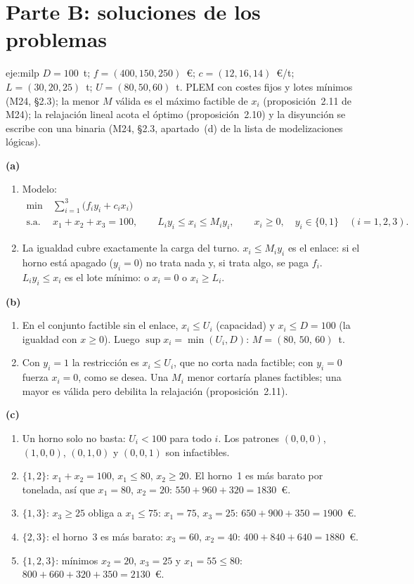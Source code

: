 \section{Parte B: soluciones de los problemas}

\begin{solucion}{eje:milp}
\datos $D=100$~t; $f=(400,150,250)$~€; $c=(12,16,14)$~€/t; $L=(30,20,25)$~t; $U=(80,50,60)$~t.
\planteamiento PLEM con costes fijos y lotes mínimos (M24, §2.3); la menor $M$ válida es el máximo factible de $x_i$ (proposición~2.11 de M24); la relajación lineal acota el óptimo (proposición~2.10) y la disyunción se escribe con una binaria (M24, §2.3, apartado~(d) de la lista de modelizaciones lógicas).
\pasos

\noindent\textbf{(a)}
\begin{enumerate}[label=\arabic*.]
  \item Modelo:
  \[
  \begin{aligned}
  \min\ &\sum_{i=1}^{3}\bigl(f_iy_i+c_ix_i\bigr)\\
  \text{s.a.}\ &x_1+x_2+x_3=100,\qquad L_iy_i\le x_i\le M_iy_i,\qquad x_i\ge 0,\quad y_i\in\{0,1\}\quad(i=1,2,3).
  \end{aligned}
  \]
  \item La igualdad cubre exactamente la carga del turno. $x_i\le M_iy_i$ es el enlace: si el horno está apagado ($y_i=0$) no trata nada y, si trata algo, se paga $f_i$. $L_iy_i\le x_i$ es el lote mínimo: o $x_i=0$ o $x_i\ge L_i$.
\end{enumerate}

\noindent\textbf{(b)}
\begin{enumerate}[label=\arabic*.]
  \item En el conjunto factible sin el enlace, $x_i\le U_i$ (capacidad) y $x_i\le D=100$ (la igualdad con $x\ge 0$). Luego $\sup x_i=\min(U_i,D)$: $M=(80,\,50,\,60)$~t.
  \item Con $y_i=1$ la restricción es $x_i\le U_i$, que no corta nada factible; con $y_i=0$ fuerza $x_i=0$, como se desea. Una $M_i$ menor cortaría planes factibles; una mayor es válida pero debilita la relajación (proposición~2.11).
\end{enumerate}

\noindent\textbf{(c)}
\begin{enumerate}[label=\arabic*.]
  \item Un horno solo no basta: $U_i<100$ para todo $i$. Los patrones $(0,0,0)$, $(1,0,0)$, $(0,1,0)$ y $(0,0,1)$ son infactibles.
  \item $\{1,2\}$: $x_1+x_2=100$, $x_1\le 80$, $x_2\ge 20$. El horno~1 es más barato por tonelada, así que $x_1=80$, $x_2=20$: $550+960+320=1830$~€.
  \item $\{1,3\}$: $x_3\ge 25$ obliga a $x_1\le 75$: $x_1=75$, $x_3=25$: $650+900+350=1900$~€.
  \item $\{2,3\}$: el horno~3 es más barato: $x_3=60$, $x_2=40$: $400+840+640=1880$~€.
  \item $\{1,2,3\}$: mínimos $x_2=20$, $x_3=25$ y $x_1=55\le 80$: $800+660+320+350=2130$~€.
\end{enumerate}


\end{solucion}
